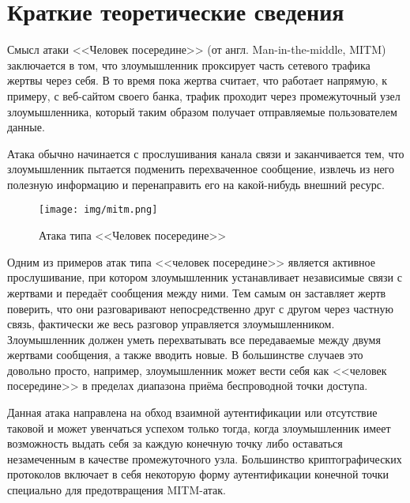 \section{Краткие теоретические сведения}

Смысл атаки <<Человек посередине>> (от англ. Man-in-the-middle, MITM) заключается в том, что злоумышленник проксирует часть сетевого трафика жертвы через себя. В то время пока жертва считает, что работает напрямую, к примеру, с веб-сайтом своего банка, трафик проходит через промежуточный узел злоумышленника, который таким образом получает  отправляемые пользователем данные.

Атака обычно начинается с прослушивания канала связи и заканчивается тем, что злоумышленник пытается подменить перехваченное сообщение, извлечь из него полезную информацию и перенаправить его на какой-нибудь внешний ресурс.

\begin{figure}[H]
	\texttt{[image: img/mitm.png]}
	\caption{Атака типа <<Человек посередине>>}
\end{figure}

Одним из примеров атак типа <<человек посередине>> является активное прослушивание, при котором злоумышленник устанавливает независимые связи с жертвами и передаёт сообщения между ними. Тем самым он заставляет жертв поверить, что они разговаривают непосредственно друг с другом через частную связь, фактически же весь разговор управляется злоумышленником. Злоумышленник должен уметь перехватывать все передаваемые между двумя жертвами сообщения, а также вводить новые. В большинстве случаев это довольно просто, например, злоумышленник может вести себя как <<человек посередине>> в пределах диапазона приёма беспроводной точки доступа.

Данная атака направлена на обход взаимной аутентификации или отсутствие таковой и может увенчаться успехом только тогда, когда злоумышленник имеет возможность выдать себя за каждую конечную точку либо оставаться незамеченным в качестве промежуточного узла. Большинство криптографических протоколов включает в себя некоторую форму аутентификации конечной точки специально для предотвращения MITM-атак. 